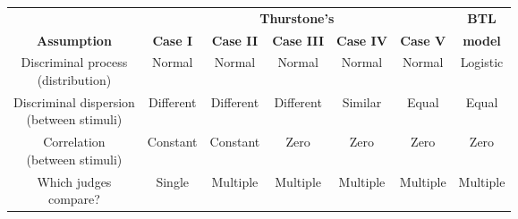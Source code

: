 \documentclass[border=3mm, varwidth=500mm]{standalone}
\begin{document}
\centering
\begin{table}[h!]
    \begin{center}
    \begin{tabular}{ccccccc}
        & \multicolumn{5}{c}{ \textbf{Thurstone's} } & \textbf{BTL} \\
        \cline{2-6}
        \textbf{Assumption} & \textbf{Case I} & \textbf{Case II} & \textbf{Case III} & \textbf{Case IV} & \textbf{Case V} & \textbf{model} \\
        \hline
        
        \rowcolor{gray.95} \Centerstack{ Discriminal process \\ (distribution) } & Normal & Normal & Normal & Normal & Normal & Logistic \\
        
        \Centerstack{ Discriminal dispersion \\ (between stimuli) } & Different & Different & Different & Similar & Equal & Equal \\

        \rowcolor{gray.95} \Centerstack{ Correlation \\ (between stimuli) } & Constant & Constant & Zero & Zero & Zero & Zero \\

        \Centerstack{ Which judges \\ compare? } & Single & Multiple & Multiple & Multiple & Multiple & Multiple \\

         
    \end{tabular}
    \end{center}
\end{table}
\end{document}
